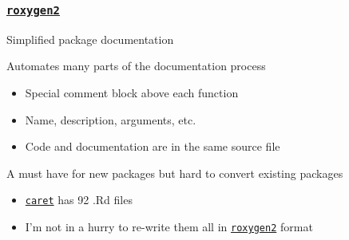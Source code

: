 \documentclass[12 pt]{beamer}\usepackage[]{graphicx}\usepackage[]{color}
\newcommand{\pkg}[1]{{\fontseries{b}\selectfont #1}}
\renewcommand{\pkg}[1]{{\color{darkgreen}\texttt{#1}}}
\begin{document}

  \begin{frame}[fragile]
\frametitle{\href{http://cran.r-project.org/web/packages/roxygen2/index.html}{\pkg{roxygen2}}}

Simplified package documentation

\vspace{.2in}

Automates many parts of the documentation process
\begin{itemize}
\item  Special comment block above each function
\item Name, description, arguments, etc.
\item Code and documentation are in the same source file
\end{itemize}

\vspace{.2in}

A must have for new packages but hard to convert existing packages
\begin{itemize}
\item   \href{http://cran.r-project.org/web/packages/caret/index.html}{\pkg{caret}} has 92 .Rd files
\item I'm not in a hurry to re-write them all in \href{http://cran.r-project.org/web/packages/roxygen2/index.html}{\pkg{roxygen2}} format
\end{itemize}




\end{frame}




\end{document}
